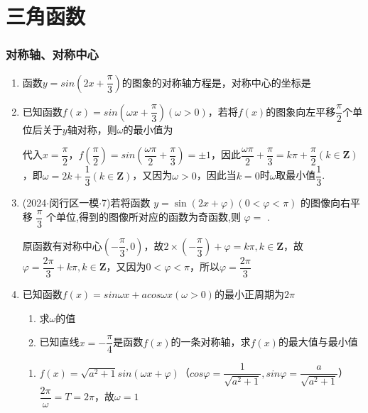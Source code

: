 \chapter*{三角函数}
\subsection*{对称轴、对称中心}
\begin{enumerate}
    \item 函数$y = sin\left(2x+\dfrac{\pi}{3}\right)$的图象的对称轴方程是，对称中心的坐标是
    
    \item 已知函数$f(x) = sin\left(\omega x + \dfrac{\pi}{3}\right) (\omega > 0)$，若将$f(x)$的图象向左平移$\dfrac{\pi}{2}$个单位后关于$y$轴对称，则$\omega$的最小值为
    \begin{jieda}
        代入$x = \dfrac{\pi}{2}$，$f\left(\dfrac{\pi}{2}\right) = sin\left(\dfrac{\omega \pi}{2} + \dfrac{\pi}{3}\right) = \pm 1$，因此$\dfrac{\omega \pi}{2} + \dfrac{\pi}{3} = k\pi + \dfrac{\pi}{2} (k \in \mathbf{Z})$，即$\omega = 2k + \dfrac{1}{3} (k \in \mathbf{Z})$，又因为$\omega > 0$，因此当$k = 0$时$\omega$取最小值$\dfrac{1}{3}$.
    \end{jieda}

    \item (2024$\cdot$闵行区一模$\cdot$7)若将函数 $y = \sin \left( {{2x} + \varphi }\right) \left( {0 < \varphi  < \pi }\right)$ 的图像向右平移 $\dfrac{\pi }{3}$ 个单位,得到的图像所对应的函数为奇函数,则 $\varphi  =$ .
    \begin{jieda}
        原函数有对称中心$\left(-\dfrac{\pi}{3}, 0\right)$，故$2 \times \left(-\dfrac{\pi}{3}\right) + \varphi = k\pi, k \in \mathbf{Z}$，故$\varphi = \dfrac{2\pi}{3} + k\pi, k \in \mathbf{Z}$，又因为$0 < \varphi  < \pi $，所以$\varphi = \dfrac{2\pi}{3}$
    \end{jieda}

    \item 已知函数$f(x) = sin\omega x+acos\omega x (\omega > 0)$的最小正周期为$2\pi$
    \begin{enumerate}
        \item 求$\omega$的值
        \item 已知直线$x = -\dfrac{\pi}{4}$是函数$f(x)$的一条对称轴，求$f(x)$的最大值与最小值
    \end{enumerate}
    \begin{jieda}
        \begin{enumerate}
            \item $f(x) = \sqrt{a^2+1}sin(\omega x + \varphi)$（$cos\varphi = \dfrac{1}{\sqrt{a^2+1}}, sin\varphi = \dfrac{a}{\sqrt{a^2+1}}$）$\dfrac{2\pi}{\omega} = T = 2\pi$，故$\omega = 1$


\end{enumerate}
\end{jieda}
\end{enumerate}

